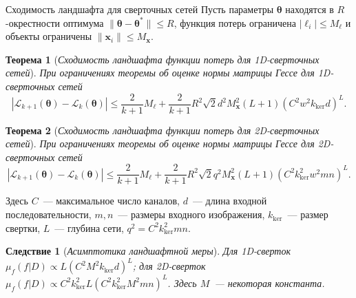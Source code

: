 \documentclass[10pt,pdf,hyperref={unicode}]{beamer}
\newtheorem{rustheorem}{Теорема}
\newtheorem{ruscorollary}{Следствие}
\begin{document}
\begin{frame}{Сходимость ландшафта для сверточных сетей}
\justifying
\footnotesize
Пусть параметры $\boldsymbol{\theta}$ находятся в $R$-окрестности оптимума $\|\boldsymbol{\theta}-\boldsymbol{\theta}^*\|\le R$, функция потерь ограничена $|\ell_i|\le M_{\ell}$ и объекты ограничены $\|\mathbf{x}_i\|\le M_{\mathbf{x}}$.

\begin{rustheorem}[\emph{Сходимость ландшафта функции потерь для 1D-сверточных сетей}]
    \justifying
    При ограничениях теоремы об оценке нормы матрицы Гессе для 1D-сверточных сетей
    \[
        |\mathcal{L}_{k+1}(\boldsymbol{\theta})-\mathcal{L}_k(\boldsymbol{\theta})|\le\frac{2}{k+1}M_{\ell}+\frac{2}{k+1}R^2\sqrt{2}d^2M_{\mathbf{x}}^2(L+1)(C^2w^2k_{\mathrm{ker}}d)^L.
    \]
\end{rustheorem}

\begin{rustheorem}[\emph{Сходимость ландшафта функции потерь для 2D-сверточных сетей}]
    \justifying
    При ограничениях теоремы об оценке нормы матрицы Гессе для 2D-сверточных сетей
    \[
        |\mathcal{L}_{k+1}(\boldsymbol{\theta})-\mathcal{L}_k(\boldsymbol{\theta})|\le\frac{2}{k+1}M_{\ell}+\frac{2}{k+1}R^2\sqrt{2}q^2M_{\mathbf{x}}^2(L+1)(C^2k_{\mathrm{ker}}^2w^2mn)^L.
    \]
\end{rustheorem}

Здесь $C$~--- максимальное число каналов, $d$~--- длина входной последовательности, $m,n$~--- размеры входного изображения, $k_{\mathrm{ker}}$~--- размер свертки, $L$~--- глубина сети, $q^2=C^2k_{\mathrm{ker}}^2mn$.

\begin{ruscorollary}[\emph{Асимптотика ландшафтной меры}]
    \justifying
    Для 1D-сверток $\mu_f(f|D)\propto L(C^2M^2k_{\mathrm{ker}}d)^{L}$; для 2D-сверток $\mu_f(f|D)\propto C^2k_{\mathrm{ker}}^2L(C^2k_{\mathrm{ker}}^2M^2mn)^{L}$. Здесь $M$~--- некоторая константа.
\end{ruscorollary}
\end{frame}
\end{document}
